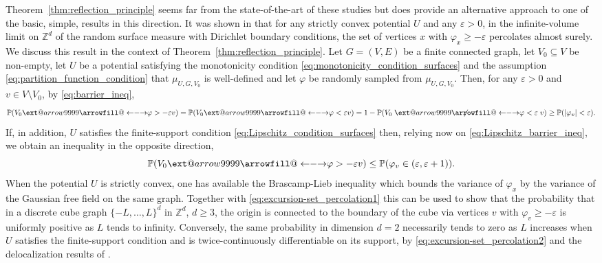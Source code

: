 \documentclass[english]{article}
\makeatletter
\newcommand\xleftrightarrow[2][]{%
  \ext@arrow 9999{\longleftrightarrowfill@}{#1}{#2}}
\newcommand\longleftrightarrowfill@{%
  \arrowfill@\leftarrow\relbar\rightarrow}
\theoremstyle{plain}
\theoremstyle{plain}
\makeatother
\begin{document}
Theorem~\ref{thm:reflection_principle} seems far from the state-of-the-art of these studies but does provide an alternative approach to one of the basic, simple, results in this direction. It was shown in \cite{bricmont1987percolation} that for any strictly convex potential $U$ and any $\varepsilon>0$, in the infinite-volume limit on $\mathbb{Z}^d$ of the random surface measure with Dirichlet boundary conditions, the set of vertices $x$ with $\varphi_x\ge -\varepsilon$ percolates almost surely. We discuss this result in the context of Theorem~\ref{thm:reflection_principle}. Let $G=(V,E)$ be a finite connected graph, let $V_0\subseteq V$ be non-empty, let $U$ be a potential satisfying the monotonicity
condition \eqref{eq:monotonicity_condition_surfaces} and the
assumption \eqref{eq:partition_function_condition} that
$\mu_{U,G,V_0}$ is well-defined and let $\varphi$ be randomly sampled
from $\mu_{U,G,V_{0}}$. Then, for any $\varepsilon>0$ and $v\in V\setminus V_0$, by \eqref{eq:barrier_ineq},
\begin{equation}\label{eq:excursion-set_percolation1}
  \mathbb{P}(V_0\xleftrightarrow{\varphi> -\varepsilon} v) = \mathbb{P}(V_0\xleftrightarrow{\varphi< \varepsilon} v) = 1 - \mathbb{P}(V_0\centernot{\xleftrightarrow{\varphi< \varepsilon}} v) \ge \mathbb{P}(|\varphi_v|< \varepsilon).
\end{equation}
If, in addition, $U$ satisfies the finite-support condition
\eqref{eq:Lipschitz_condition_surfaces} then, relying now on \eqref{eq:Lipschitz_barrier_ineq}, we obtain an inequality in the opposite direction,
\begin{equation}\label{eq:excursion-set_percolation2}
  \mathbb{P}(V_0\xleftrightarrow{\varphi> -\varepsilon} v) \le \mathbb{P}(\varphi_v\in (\varepsilon, \varepsilon+1)).
\end{equation}
When the potential $U$ is strictly convex, one has available the Brascamp-Lieb inequality \cite{brascamp1976extensions} which bounds the variance of $\varphi_x$ by the variance of the Gaussian free field on the same graph. Together with \eqref{eq:excursion-set_percolation1} this can be used to show that the probability that in a discrete cube graph $\{-L,\ldots, L\}^d$ in $\mathbb{Z}^d$, $d\ge 3$, the origin is connected to the boundary of the cube via vertices $v$ with $\varphi_v\ge-\varepsilon$ is uniformly positive as $L$ tends to infinity. Conversely, the same probability in dimension $d=2$ necessarily tends to zero as $L$ increases when $U$ satisfies the finite-support condition and is twice-continuously differentiable on its support, by \eqref{eq:excursion-set_percolation2} and the delocalization results of \cite{milos2015delocalization}.
\end{document}
